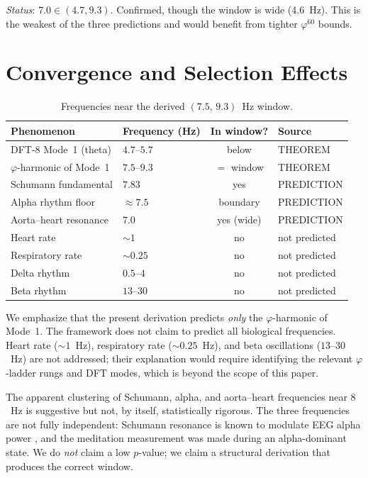 \documentclass[11pt,a4paper]{article}
\begin{document}
\noindent
\emph{Status}: $7.0 \in (4.7, 9.3)$. Confirmed, though the window
is wide (4.6~Hz). This is the weakest of the three predictions and
would benefit from tighter $\varphi^{60}$ bounds.

\section{Convergence and Selection Effects}
\label{sec:convergence}

\begin{table}[H]
\centering
\caption{Frequencies near the derived $(7.5,\,9.3)$~Hz window.}
\label{tab:convergence}
\begin{tabular}{@{}llcl@{}}
\toprule
Phenomenon & Frequency (Hz) & In window? & Source \\
\midrule
DFT-8 Mode~1 (theta)        & $4.7$--$5.7$ & below & THEOREM \\
$\varphi$-harmonic of Mode~1 & $7.5$--$9.3$ & $=$ window & THEOREM \\
Schumann fundamental         & $7.83$       & yes & PREDICTION \\
Alpha rhythm floor           & $\approx 7.5$ & boundary & PREDICTION \\
Aorta--heart resonance         & $7.0$        & yes (wide) & PREDICTION \\
\midrule
Heart rate                   & $\sim 1$     & no & not predicted \\
Respiratory rate             & $\sim 0.25$  & no & not predicted \\
Delta rhythm                 & $0.5$--$4$   & no & not predicted \\
Beta rhythm                  & $13$--$30$   & no & not predicted \\
\bottomrule
\end{tabular}
\end{table}

\noindent
We emphasize that the present derivation predicts \emph{only} the
$\varphi$-harmonic of Mode~1. The framework does not claim to predict
all biological frequencies. Heart rate ($\sim 1$~Hz), respiratory
rate ($\sim 0.25$~Hz), and beta oscillations ($13$--$30$~Hz) are
not addressed; their explanation would require identifying the
relevant $\varphi$-ladder rungs and DFT modes, which is beyond the
scope of this paper.

The apparent clustering of Schumann, alpha, and aorta--heart frequencies
near $8$~Hz is suggestive but not, by itself, statistically rigorous.
The three frequencies are not fully independent: Schumann resonance
is known to modulate EEG alpha power \citep{saroka2011}, and the
meditation measurement was made during an alpha-dominant state.
We do \emph{not} claim a low $p$-value; we claim a structural
derivation that produces the correct window.
\end{document}
